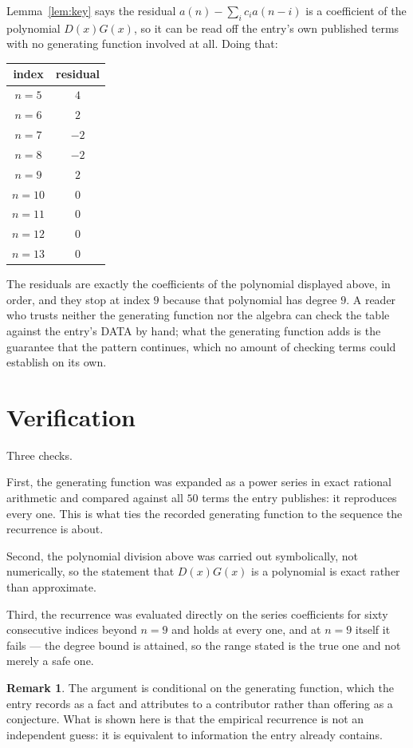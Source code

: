 \documentclass[11pt,a4paper]{article}
\theoremstyle{plain}
\theoremstyle{definition}
\newtheorem{remark}[theorem]{Remark}
\begin{document}
Lemma~\ref{lem:key} says the residual $a(n)-\sum_ic_ia(n-i)$ is a coefficient of the
polynomial $D(x)G(x)$, so it can be read off the entry's own published terms with no
generating function involved at all. Doing that:
\begin{center}
\begin{tabular}{cc}
index & residual \\ \hline
$n=5$ & $4$ \\
$n=6$ & $2$ \\
$n=7$ & $-2$ \\
$n=8$ & $-2$ \\
$n=9$ & $2$ \\
$n=10$ & $0$ \\
$n=11$ & $0$ \\
$n=12$ & $0$ \\
$n=13$ & $0$
\end{tabular}
\end{center}
The residuals are exactly the coefficients of the polynomial displayed above, in order, and
they stop at index $9$ because that polynomial has degree $9$. A reader who trusts
neither the generating function nor the algebra can check the table against the entry's DATA
by hand; what the generating function adds is the guarantee that the pattern continues, which
no amount of checking terms could establish on its own.

\section{Verification}

Three checks.

First, the generating function was expanded as a power series in exact rational arithmetic and
compared against all $50$ terms the entry publishes: it reproduces every one. This is
what ties the recorded generating function to the sequence the recurrence is about.

Second, the polynomial division above was carried out symbolically, not numerically, so the
statement that $D(x)G(x)$ is a polynomial is exact rather than approximate.

Third, the recurrence was evaluated directly on the series coefficients for sixty consecutive
indices beyond $n=9$ and holds at every one, and at $n=9$ itself it fails --- the
degree bound is attained, so the range stated is the true one and not merely a safe one.

\begin{remark}
The argument is conditional on the generating function, which the entry records as a fact and
attributes to a contributor rather than offering as a conjecture. What is shown here is that
the empirical recurrence is not an independent guess: it is equivalent to information the
entry already contains.
\end{remark}
\end{document}
